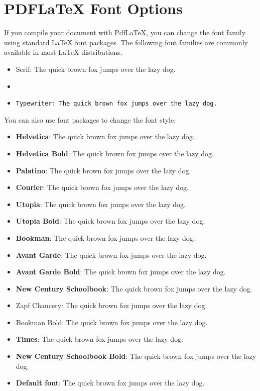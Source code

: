 
\section{PDFLaTeX Font Options}

If you compile your document with PdfLaTeX, you can change the font family using standard LaTeX font packages.
The following font families are commonly available in most LaTeX distributions.\\

\begin{itemize}[noitemsep]
    \item \rm{Serif: The quick brown fox jumps over the lazy dog.}
    \item {}
    \item \tt{Typewriter: The quick brown fox jumps over the lazy dog.}
\end{itemize}
You can also use font packages to change the font style:
\begin{itemize}[noitemsep]
    \item { \textbf{Helvetica}: The quick brown fox jumps over the lazy dog.}
    \item { \textbf{Helvetica Bold}: The quick brown fox jumps over the lazy dog.}
    \item { \textbf{Palatino}: The quick brown fox jumps over the lazy dog.}
    \item { \textbf{Courier}: The quick brown fox jumps over the lazy dog.}
    \item { \textbf{Utopia}: The quick brown fox jumps over the lazy dog.}
    \item { \textbf{Utopia Bold}: The quick brown fox jumps over the lazy dog.}
    \item { \textbf{Bookman}: The quick brown fox jumps over the lazy dog.}
    \item { \textbf{Avant Garde}: The quick brown fox jumps over the lazy dog.}
    \item { \textbf{Avant Garde Bold}: The quick brown fox jumps over the lazy dog.}
    \item { \textbf{New Century Schoolbook}: The quick brown fox jumps over the lazy dog.}
    \item { Zapf Chancery: The quick brown fox jumps over the lazy dog.}
    \item { Bookman Bold: The quick brown fox jumps over the lazy dog.}
    \item { \textbf{Times}: The quick brown fox jumps over the lazy dog.}
    \item { \textbf{New Century Schoolbook Bold}: The quick brown fox jumps over the lazy dog.}
    \item \textbf{Default font}: The quick brown fox jumps over the lazy dog.
\end{itemize}


